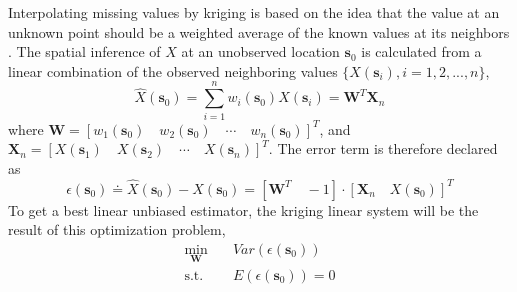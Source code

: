 \documentclass[12pt]{article}
\numberwithin{equation}{section}
\numberwithin{table}{section}
\numberwithin{figure}{section}
\newcommand{\bms}{\bm{s}}
\begin{document}
Interpolating missing values by kriging is based on the idea that the
value at an unknown point should be a weighted average of the known
values at its neighbors \cite{Cressie93}. 
The spatial inference of $X$ at an unobserved location $\bms_0$ is
calculated from a linear combination of the observed neighboring
values $\{X(\bms_i), i=1,2,...,n\}$,
\begin{equation} \label{nawls}
  \hat{X}(\bms_0) = \sum_{i=1}^n w_i(\bms_0)X(\bms_i) = \bm{W}^T\bm{X}_n
\end{equation}
where $\bm{W} = \left[ w_1(\bms_0) \quad w_2(\bms_0) \quad \cdots 
\quad w_n(\bms_0) \right]^T$, and 
$\bm{X}_n = \left[ X(\bms_1) \quad X(\bms_2) \quad \cdots
\quad X(\bms_n) \right]^T$. The error term is therefore declared as
\begin{equation} \label{errordef}
  \epsilon(\bms_0) \doteq \hat{X}(\bms_0) - X(\bms_0) 
  = \left[ \bm{W}^T \quad -1 \right] \cdot \left[ \bm{X}_n \quad X(\bms_0) \right]^T
\end{equation}
To get a best linear unbiased estimator, the kriging linear system
will be the result of this optimization problem,
\begin{equation} \label{krigsys}
\begin{split}
  \min_{\bm{W}} \quad & Var(\epsilon(\bms_0))\\
  \mbox{s.t.} \quad & E(\epsilon(\bms_0)) = 0
\end{split}
\end{equation}
\end{document}

